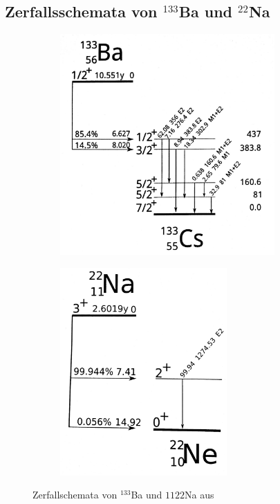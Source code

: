 \subsection{Zerfallsschemata von $^{133}$Ba und $^{22}$Na}
\begin{figure}[h]
  \centering
  \begin{subfigure}[h]{0.5\textwidth}
    \centering
    \includegraphics[width=0.9\textwidth]{data/ba_scheme.png}
  \end{subfigure}%
  \begin{subfigure}[h]{0.5\textwidth}
    \centering
    \includegraphics[width=0.7\textwidth]{data/na_scheme.png}
  \end{subfigure}
  \caption{Zerfallschemata von $^{133}$Ba und $11{22}$Na aus \cite{praktikumsheft}}
  \label{fig:scheme}
\end{figure}   
